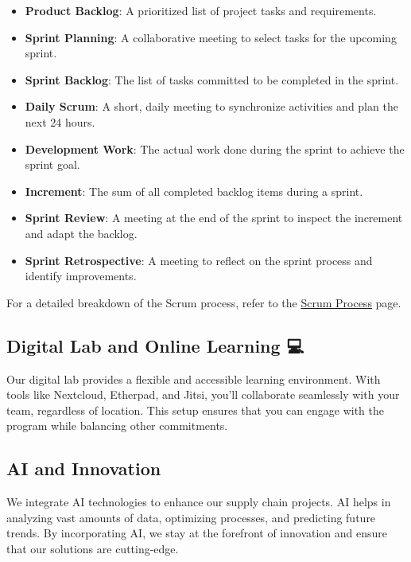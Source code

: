\documentclass[
  letterpaper,
  DIV=11,
  numbers=noendperiod]{scrreprt}
\providecommand{\tightlist}{%
  \setlength{\itemsep}{0pt}\setlength{\parskip}{0pt}}\usepackage{longtable,booktabs,array}
\begin{document}
\begin{itemize}
\tightlist
\item
  \textbf{Product Backlog}: A prioritized list of project tasks and
  requirements.
\item
  \textbf{Sprint Planning}: A collaborative meeting to select tasks for
  the upcoming sprint.
\item
  \textbf{Sprint Backlog}: The list of tasks committed to be completed
  in the sprint.
\item
  \textbf{Daily Scrum}: A short, daily meeting to synchronize activities
  and plan the next 24 hours.
\item
  \textbf{Development Work}: The actual work done during the sprint to
  achieve the sprint goal.
\item
  \textbf{Increment}: The sum of all completed backlog items during a
  sprint.
\item
  \textbf{Sprint Review}: A meeting at the end of the sprint to inspect
  the increment and adapt the backlog.
\item
  \textbf{Sprint Retrospective}: A meeting to reflect on the sprint
  process and identify improvements.
\end{itemize}

For a detailed breakdown of the Scrum process, refer to the
\href{scrum-process.qmd}{Scrum Process} page.

\subsection{Digital Lab and Online Learning
💻}\label{digital-lab-and-online-learning}

Our digital lab provides a flexible and accessible learning environment.
With tools like Nextcloud, Etherpad, and Jitsi, you'll collaborate
seamlessly with your team, regardless of location. This setup ensures
that you can engage with the program while balancing other commitments.

\subsection{AI and Innovation 🤖}\label{ai-and-innovation}

We integrate AI technologies to enhance our supply chain projects. AI
helps in analyzing vast amounts of data, optimizing processes, and
predicting future trends. By incorporating AI, we stay at the forefront
of innovation and ensure that our solutions are cutting-edge.
\end{document}
